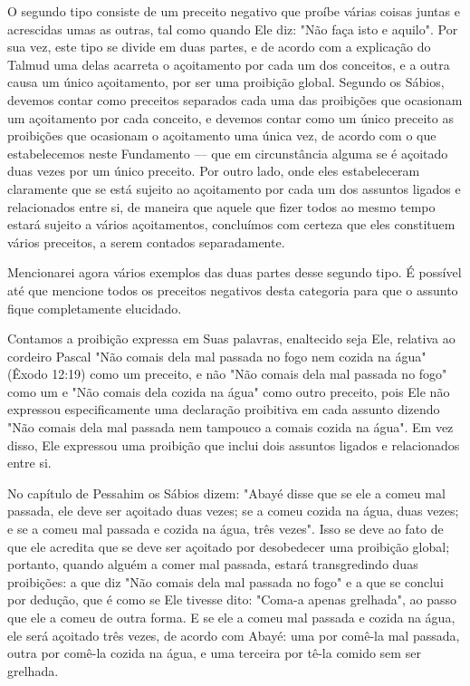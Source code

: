 \begin{itemize}
\begin{enumrate}
O segundo tipo consiste de um preceito negativo que proíbe várias coisas
juntas e acrescidas umas as outras, tal como quando Ele diz: "Não faça
isto e aquilo". Por sua vez, este tipo se divide em duas partes, e de
acordo com a explicação do Talmud uma delas acarreta o açoitamento por
cada um dos con­ceitos, e a outra causa um único açoitamento, por ser
uma proibição global. Segundo os Sábios, devemos contar como preceitos
separados cada uma das proibições que ocasionam um açoitamento por cada
conceito, e devemos con­tar como um único preceito as proibições que
ocasionam o açoitamento uma única vez, de acordo com o que estabelecemos
neste Fundamento --- que em circunstância alguma se é açoitado duas
vezes por um único preceito. Por ou­tro lado, onde eles estabeleceram
claramente que se está sujeito ao açoitamen­to por cada um dos assuntos
ligados e relacionados entre si, de maneira que aquele que fizer todos
ao mesmo tempo estará sujeito a vários açoitamentos, concluímos com
certeza que eles constituem vários preceitos, a serem conta­dos
separadamente.

Mencionarei agora vários exemplos das duas partes desse segundo tipo. É
possível até que mencione todos os preceitos negativos desta categoria
para que o assunto fique completamente elucidado.

Contamos a proibição expressa em Suas palavras, enaltecido seja Ele,
relativa ao cordeiro Pascal "Não comais dela mal passada no fogo nem
cozida na água" (Êxodo 12:19) como um preceito, e não "Não comais dela
mal passa­da no fogo" como um e "Não comais dela cozida na água" como
outro precei­to, pois Ele não expressou especificamente uma declaração
proibitiva em cada assunto dizendo "Não comais dela mal passada nem
tampouco a comais cozida na água". Em vez disso, Ele expressou uma
proibição que inclui dois assuntos ligados e relacionados entre si.

No capítulo de Pessahim os Sábios dizem: "Abayé disse que se ele a comeu
mal passada, ele deve ser açoitado duas vezes; se a comeu cozida na
água, duas vezes; e se a comeu mal passada e cozida na água, três
vezes". Isso se deve ao fato de que ele acredita que se deve ser
açoitado por desobedecer uma proibição global; portanto, quando alguém a
comer mal passada, estará transgredindo duas proibições: a que diz "Não
comais dela mal passada no fo­go" e a que se conclui por dedução, que é
como se Ele tivesse dito: "Coma-a apenas grelhada", ao passo que ele a
comeu de outra forma. E se ele a comeu mal passada e cozida na água, ele
será açoitado três vezes, de acordo com Aba­yé: uma por comê-la mal
passada, outra por comê-la cozida na água, e uma ter­ceira por tê-la
comido sem ser grelhada.


\end{enumrate}
\end{itemize}
